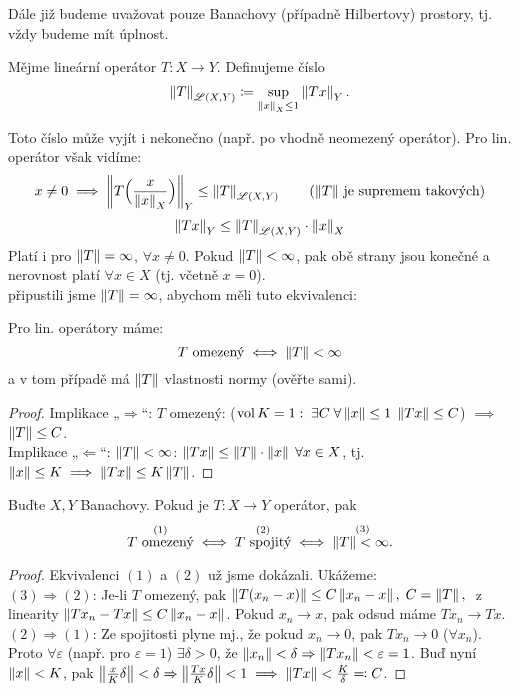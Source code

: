 Dále již budeme uvažovat pouze Banachovy (případně Hilbertovy) prostory, tj. vždy budeme mít úplnost.

\begin{definition}
\label{1.Norma operatoru}
Mějme lineární operátor $T: X \to Y$. Definujeme číslo
$$
  \left\lVert T\right\rVert_{\mathscr{L}(X, Y)} \coloneqq \underset{\left\lVert x\right\rVert_X \leq 1}{\sup} \left\lVert Tx\right\rVert_Y.
$$
\end{definition}
Toto číslo může vyjít i nekonečno (např. po vhodně neomezený operátor). Pro lin. operátor však vidíme:
$$
  x \neq 0 \implies
  \left\lVert T\Big(\frac{x}{\left\lVert x\right\rVert_X}\Big)\right\rVert_Y \leq \left\lVert T\right\rVert_{\mathscr{L}(X, Y)}
  \hspace{2em}
  \text{($\left\lVert T\right\rVert$ je supremem takových)}
$$
$$
    \left\lVert Tx\right\rVert_Y \leq \left\lVert T\right\rVert_{\mathscr{L}(X, Y)} \cdot \left\lVert x\right\rVert_X
$$
Platí i pro $\left\lVert T\right\rVert = \infty$, $\forall x \neq 0$. Pokud $\left\lVert T\right\rVert < \infty$, pak obě strany jsou konečné a  nerovnost platí $\forall x \in X$ (tj. včetně $x = 0$).
\\
\Poznamka připustili jsme $\left\lVert T\right\rVert = \infty$, abychom měli tuto ekvivalenci:
\begin{lemma}
Pro lin. operátory máme:
$$
    T \text{ omezený}
    \iff
    \left\lVert T\right\rVert < \infty
$$
a v tom případě má $\left\lVert T\right\rVert$ vlastnosti normy (ověřte sami).
\end{lemma}
\begin{proof}
Implikace „$\Rightarrow$“: $T$ omezený: ($\operatorname{vol} K = 1: \; \exists C \; \forall \left\lVert x\right\rVert \leq 1 \; \left\lVert Tx\right\rVert \leq C$) $\implies$ $\left\lVert T\right\rVert \leq C$.
\\[5pt]
Implikace „$\Leftarrow$“: $\left\lVert T\right\rVert < \infty$: $\left\lVert Tx\right\rVert \leq \left\lVert T\right\rVert \cdot \left\lVert x\right\rVert \; \forall x \in X$, tj. $\left\lVert x\right\rVert \leq K \implies \left\lVert Tx\right\rVert \leq K \left\lVert T\right\rVert$.
\end{proof}

\begin{lemma}
Buďte $X,Y$ Banachovy. Pokud je $T: X \to Y$  operátor, pak
$$
    \overset{(1)}{T \text{ omezený}}
    \iff
    \overset{(2)}{T \text{ spojitý}}
    \iff
    \overset{(3)}{\left\lVert T\right\rVert < \infty.}
$$
\end{lemma}
\begin{proof}
Ekvivalenci $(1)$ a $(2)$ už jsme dokázali. Ukážeme:
\\[5pt]
$(3) \Rightarrow (2)$: Je-li $T$ omezený, pak $\left\lVert T (x_n - x)\right\rVert \leq C \left\lVert x_n - x\right\rVert, \; C = \left\lVert T\right\rVert, \;$ z linearity $\left\lVert Tx_n - Tx\right\rVert \leq C \left\lVert x_n - x\right\rVert$. Pokud $x_n \to x$, pak odsud máme $Tx_n \to Tx$.
\\[5pt]
$(2) \Rightarrow (1)$: Ze spojitosti plyne mj., že pokud $x_n \to 0$, pak $Tx_n \to 0$ ($\forall x_n$). Proto $\forall \varepsilon$ (např. pro $\varepsilon = 1$) $\exists \delta>0$, že $\left\lVert x_n\right\rVert < \delta \Rightarrow \left\lVert Tx_n\right\rVert < \varepsilon = 1$. Buď nyní $\left\lVert x\right\rVert < K$, pak $\left\lVert\frac{x}{K} \delta\right\rVert < \delta \Rightarrow \left\lVert\frac{Tx}{K} \delta\right\rVert < 1 \implies \left\lVert Tx\right\rVert < \frac{K}{\delta} \eqqcolon C$.
\end{proof}

